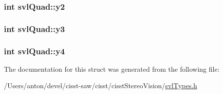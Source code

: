 \subsubsection[{y2}]{\setlength{\rightskip}{0pt plus 5cm}int svl\+Quad\+::y2}\label{structsvl_quad_af793c440c3bca87d594bb157fbf7a129}
\hypertarget{structsvl_quad_a0e4a4b82cc4977a4ac0e9159983e0d89}{}
\subsubsection[{y3}]{\setlength{\rightskip}{0pt plus 5cm}int svl\+Quad\+::y3}\label{structsvl_quad_a0e4a4b82cc4977a4ac0e9159983e0d89}
\hypertarget{structsvl_quad_ab868a587999108937b8dd2748e90e1dd}{}
\subsubsection[{y4}]{\setlength{\rightskip}{0pt plus 5cm}int svl\+Quad\+::y4}\label{structsvl_quad_ab868a587999108937b8dd2748e90e1dd}


The documentation for this struct was generated from the following file\+:\begin{DoxyCompactItemize}
\item 
/\+Users/anton/devel/cisst-\/saw/cisst/cisst\+Stereo\+Vision/\hyperlink{svl_types_8h}{svl\+Types.\+h}\end{DoxyCompactItemize}
